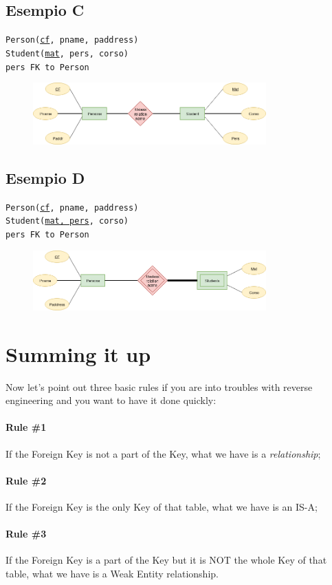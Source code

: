 \documentclass[class=book, crop=false, oneside]{standalone}
\newcommand\tab[1][1cm]{\hspace*{#1}}
\begin{document}
\subsection*{Esempio C}
\texttt{Person(\underline{cf}, pname, paddress)}\\
\texttt{Student(\underline{mat}, pers, corso)}\\
\tab[.4cm] \texttt{pers FK to Person}

\begin{figure}[H]
	\includegraphics[width=0.8\textwidth,keepaspectratio]{diagram6_02.png}
	\caption{}
	\label{diagram6_02}
\end{figure}

\subsection*{Esempio D}
\texttt{Person(\underline{cf}, pname, paddress)}\\
\texttt{Student(\underline{mat, pers}, corso)}\\
\tab[.4cm] \texttt{pers FK to Person}

\begin{figure}[H]
	\includegraphics[width=0.8\textwidth,keepaspectratio]{diagram6_03.png}
	\caption{}
	\label{diagram6_03}
\end{figure}

\section{Summing it up}
Now let's point out three basic rules if you are into troubles with reverse engineering and you want to have it done quickly:
\paragraph{Rule \#1} If the Foreign Key is not a part of the Key, what we have is a \emph{relationship};
\paragraph{Rule \#2} If the Foreign Key is the only Key of that table, what we have is an IS-A;
\paragraph{Rule \#3} If the Foreign Key is a part of the Key but it is NOT the whole Key of that table, what we have is a Weak Entity relationship.
\end{document}
